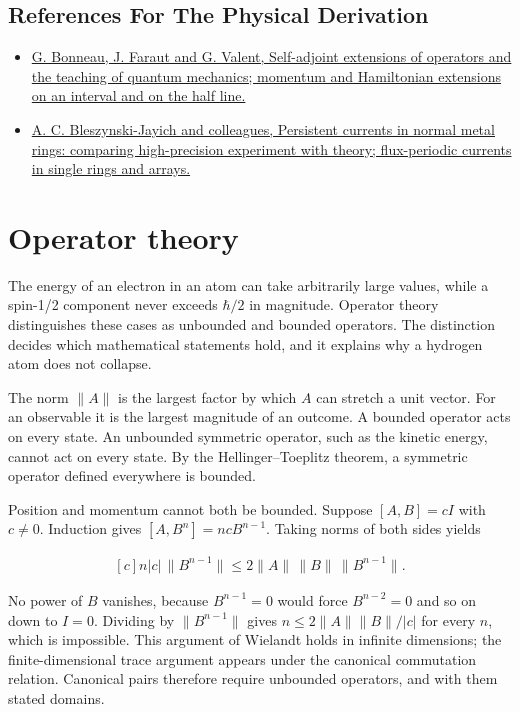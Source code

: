 \documentclass[11pt,oneside]{book}
\newenvironment{centeredalign}{\[\begin{gathered}[c]}{\end{gathered}\]}
\begin{document}
\subsection*{References For The Physical Derivation}
\begin{itemize}
\item \href{https://arxiv.org/abs/quant-ph/0103153}{G. Bonneau, J. Faraut and G. Valent, Self-adjoint extensions of operators and the teaching of quantum mechanics; momentum and Hamiltonian extensions on an interval and on the half line.}
\item \href{https://arxiv.org/abs/0906.4780}{A. C. Bleszynski-Jayich and colleagues, Persistent currents in normal metal rings: comparing high-precision experiment with theory; flux-periodic currents in single rings and arrays.}
\end{itemize}





\clearpage

\section{Operator theory}

\label{topic:operator-theory}

The energy of an electron in an atom can take arbitrarily large values, while a spin-1/2 component never exceeds \(\hbar/2\) in magnitude. Operator theory distinguishes these cases as unbounded and bounded operators. The distinction decides which mathematical statements hold, and it explains why a hydrogen atom does not collapse.

The norm \(\|A\|\) is the largest factor by which \(A\) can stretch a unit vector. For an observable it is the largest magnitude of an outcome. A bounded operator acts on every state. An unbounded symmetric operator, such as the kinetic energy, cannot act on every state. By the Hellinger--Toeplitz theorem, a symmetric operator defined everywhere is bounded.

Position and momentum cannot both be bounded. Suppose \([A,B]=cI\) with \(c\neq0\). Induction gives \([A,B^n]=ncB^{n-1}\). Taking norms of both sides yields

\begin{centeredalign}
n|c|\,\|B^{n-1}\|\leq2\|A\|\,\|B\|\,\|B^{n-1}\|.
\end{centeredalign}

No power of \(B\) vanishes, because \(B^{n-1}=0\) would force \(B^{n-2}=0\) and so on down to \(I=0\). Dividing by \(\|B^{n-1}\|\) gives \(n\leq2\|A\|\|B\|/|c|\) for every \(n\), which is impossible. This argument of Wielandt holds in infinite dimensions; the finite-dimensional trace argument appears under the canonical commutation relation. Canonical pairs therefore require unbounded operators, and with them stated domains.
\end{document}
